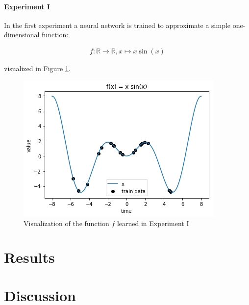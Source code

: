 \documentclass[10pt,a4paper,twocolumn]{article}
\begin{document}
\paragraph{Experiment I} In the first experiment a neural network is trained to approximate a simple one-dimensional function:

\begin{align}
f: \mathds{R} \to \mathds{R}, x \mapsto x\sin{(x)}
\end{align}

visualized in Figure \ref{fig:exp1_func}.

\begin{figure}
\centering
\includegraphics[width=\linewidth]{function.png}
\caption{Visualization of the function $f$ learned in Experiment I}\label{fig:exp1_func}
\end{figure}
\section{Results}

\section{Discussion}


\end{document}
